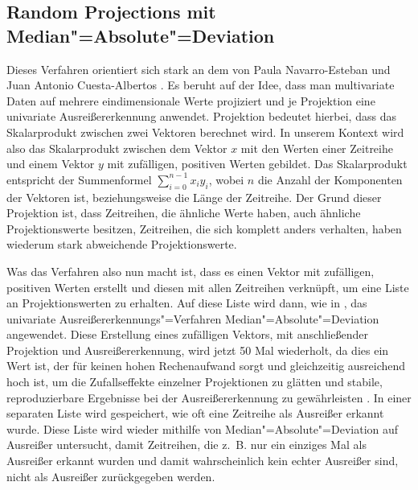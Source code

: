 \subsection{Random Projections mit Median"=Absolute"=Deviation}
Dieses Verfahren orientiert sich stark an dem von Paula Navarro-Esteban und Juan Antonio Cuesta-Albertos \cite{randomProjection}. Es beruht auf der Idee, dass man multivariate Daten auf mehrere eindimensionale Werte projiziert und je Projektion eine univariate Ausreißererkennung anwendet. Projektion bedeutet hierbei, dass das Skalarprodukt zwischen zwei Vektoren berechnet wird. In unserem Kontext wird also das Skalarprodukt zwischen dem Vektor $x$ mit den Werten einer Zeitreihe und einem Vektor $y$ mit zufälligen, positiven Werten gebildet. Das Skalarprodukt entspricht der Summenformel $\sum_{i=0}^{n-1} x_iy_i$, wobei $n$ die Anzahl der Komponenten der Vektoren ist, beziehungsweise die Länge der Zeitreihe. Der Grund dieser Projektion ist, dass Zeitreihen, die ähnliche Werte haben, auch ähnliche Projektionswerte besitzen, Zeitreihen, die sich komplett anders verhalten, haben wiederum stark abweichende Projektionswerte. 

Was das Verfahren also nun macht ist, dass es einen Vektor mit zufälligen, positiven Werten erstellt und diesen mit allen Zeitreihen verknüpft, um eine Liste an Projektionswerten zu erhalten. Auf diese Liste wird dann, wie in \cite[Ch. 3.3]{randomProjection}, das univariate Ausreißererkennungs"=Verfahren Median"=Absolute"=Deviation angewendet. Diese Erstellung eines zufälligen Vektors, mit anschließender Projektion und Ausreißererkennung, wird jetzt 50 Mal wiederholt, da dies ein Wert ist, der für keinen hohen Rechenaufwand sorgt und gleichzeitig ausreichend hoch ist, um die Zufallseffekte einzelner Projektionen zu glätten und stabile, reproduzierbare Ergebnisse bei der Ausreißererkennung zu gewährleisten \cite[Ch. 4.1]{randomProjection}. In einer separaten Liste wird gespeichert, wie oft eine Zeitreihe als Ausreißer erkannt wurde. Diese Liste wird wieder mithilfe von Median"=Absolute"=Deviation auf Ausreißer untersucht, damit Zeitreihen, die z.~B. nur ein einziges Mal als Ausreißer erkannt wurden und damit wahrscheinlich kein echter Ausreißer sind, nicht als Ausreißer zurückgegeben werden.

